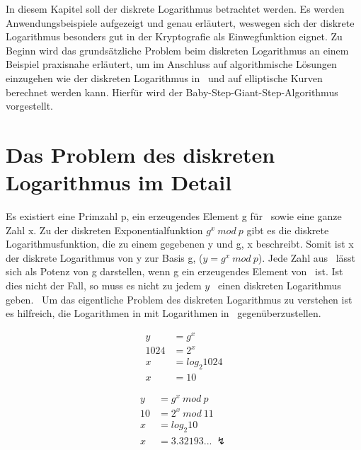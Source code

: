		In diesem Kapitel soll der diskrete Logarithmus betrachtet werden. Es werden Anwendungsbeispiele aufgezeigt und genau erläutert, weswegen sich der diskrete Logarithmus besonders gut in der Kryptografie als Einwegfunktion eignet. Zu Beginn wird das grundsätzliche Problem beim diskreten Logarithmus an einem Beispiel praxisnahe erläutert, um im Anschluss auf algorithmische Lösungen einzugehen wie der diskreten Logarithmus in \myZPStern~und auf elliptische Kurven berechnet werden kann. Hierfür wird der Baby-Step-Giant-Step-Algorithmus vorgestellt.
	
	\section*{Das Problem des diskreten Logarithmus im Detail}\label{Das Problem des diskreten Logarithmus im Detail}
		Es existiert eine Primzahl p, ein erzeugendes Element g für \myZPStern~sowie eine ganze Zahl x. Zu der diskreten Exponentialfunktion $g^x~mod~p$ gibt es die diskrete Logarithmusfunktion, die zu einem gegebenen y und g, x beschreibt. Somit ist x der diskrete Logarithmus von y zur Basis g, ($y = g^x~mod~p$). Jede Zahl aus \myZPStern~lässt sich als Potenz von g darstellen, wenn g ein erzeugendes Element von \myZPStern~ist. Ist dies nicht der Fall, so muss es nicht zu jedem $y$ \myin \myZPStern~einen diskreten Logarithmus geben.~\cite{Kryptografie:in:Theorie:und:Praxis} Um das eigentliche Problem des diskreten Logarithmus zu verstehen ist es hilfreich, die Logarithmen in  mit Logarithmen in \myZPStern~gegenüberzustellen.
		\begin{minipage}{0.24\textwidth}
			\begin{equation}
			\begin{aligned}
			y &= g^x\\
			1024 &= 2^x\\
			x &= log_2 1024\\
			x &= 10
			\end{aligned}
			\label{Gleichung Log in Z}
			\end{equation}
		\end{minipage}
		\begin{minipage}{0.24\textwidth}
			\begin{equation}
			\begin{aligned}
			y &= g^x~mod~p\\
			10 &= 2^x~mod~11\\
			x &= log_2 10\\
			x &= 3.32193...~\lightning
			\end{aligned}
			\label{Gleichung Log in ZP}
			\end{equation}
		\end{minipage}
		
